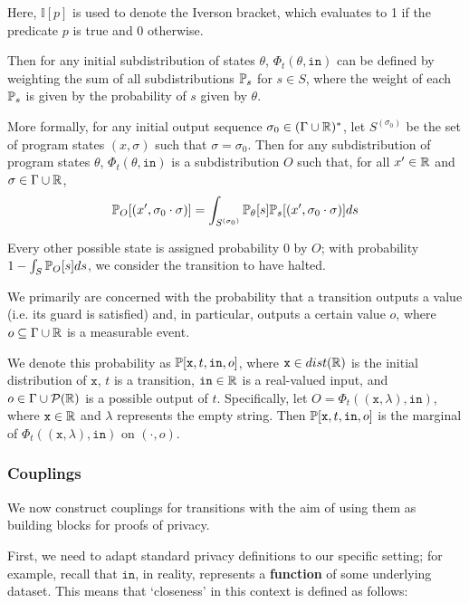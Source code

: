 Here, $\mathbb{I}[p]$ is used to denote the Iverson bracket, which evaluates to 1 if the predicate $p$ is true and 0 otherwise.

Then for any initial subdistribution of states $\theta$, $\Phi_t(\theta, \texttt{in})$ can be defined by weighting the sum of all subdistributions $\mathbb{P}_s$ for $s\in S$, where the weight of each $\mathbb{P}_s$ is given by the probability of $s$ given by $\theta$. 

More formally, for any initial output sequence $\sigma_0\in (\Gamma\cup\mathbb{R})^*$, let $S^{(\sigma_0)}$ be the set of program states $(x, \sigma)$ such that $\sigma = \sigma_0$. Then for any subdistribution of program states $\theta$, $\Phi_t(\theta, \texttt{in})$ is a subdistribution $O$ such that, for all $x'\in \mathbb{R}$ and $\sigma \in \Gamma\cup\mathbb{R}$,
\[
  \mathbb{P}_O[(x', \sigma_0\cdot \sigma)] = \int_{S^{(\sigma_0)}}\mathbb{P}_\theta[s]\mathbb{P}_s[(x', \sigma_0\cdot \sigma)]ds
\]

Every other possible state is assigned probability 0 by $O$; with probability $1-\int_S \mathbb{P}_O[s]ds$, we consider the transition to have halted.

We primarily are concerned with the probability that a transition outputs a value (i.e. its guard is satisfied) and, in particular, outputs a certain value $o$, where $o\subseteq \Gamma\cup\mathbb{R}$ is a measurable event.

We denote this probability as $\mathbb{P}[\texttt{x}, t, \texttt{in}, o]$, where $\texttt{x} \in dist(\mathbb{R})$ is the initial distribution of $\texttt{x}$, $t$ is a transition, $\texttt{in}\in \mathbb{R}$ is a real-valued input, and $o\in \Gamma\cup \mathcal{P}(\mathbb{R})$ is a possible output of $t$. 
Specifically, let $O = \Phi_t((\texttt{x}, \lambda), \texttt{in})$, where $\texttt{x}\in \mathbb{R}$ and $\lambda$ represents the empty string. Then $\mathbb{P}[\texttt{x}, t, \texttt{in}, o]$ is the marginal of $\Phi_t((\texttt{x}, \lambda), \texttt{in})$ on $(\cdot, o)$.

\subsubsection{Couplings}

We now construct couplings for transitions with the aim of using them as building blocks for proofs of privacy.

First, we need to adapt standard privacy definitions to our specific setting; for example, recall that $\texttt{in}$, in reality, represents a \textbf{function} of some underlying dataset. This means that `closeness' in this context is defined as follows:

